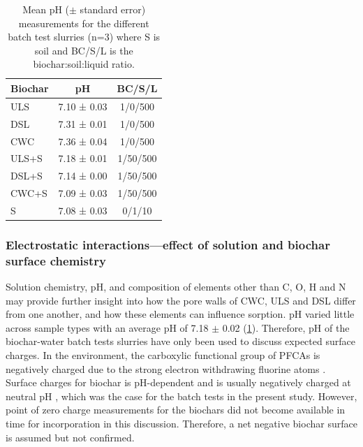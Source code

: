 \begin{table}
\centering
\caption{Mean pH ($\pm$ standard error) measurements for the different batch test slurries (n=3) where S is soil and BC/S/L is the biochar:soil:liquid ratio.}
\label{tab:pHcond}
\begin{tabular}{lcc}
\toprule
Biochar & \multicolumn{1}{c}{pH} & BC/S/L\\ \midrule
ULS   & 7.10 ± 0.03 & 1/0/500\\
DSL   & 7.31 ± 0.01 & 1/0/500\\
CWC   & 7.36 ± 0.04 & 1/0/500\\
ULS+S & 7.18 ± 0.01 & 1/50/500\\
DSL+S & 7.14 ± 0.00 & 1/50/500\\
CWC+S & 7.09 ± 0.03 & 1/50/500\\
S     & 7.08 ± 0.03 & 0/1/10\\
\bottomrule
\end{tabular}
\end{table}


\subsubsection{Electrostatic interactions---effect of solution and biochar surface chemistry \label{sec:inorganic}} 
Solution chemistry, pH, and composition of elements other than C, O, H and N may provide further insight into how the pore walls of CWC, ULS and DSL differ from one another, and how these elements can influence sorption. pH varied little across sample types with an average pH of 7.18 $\pm$ 0.02 (\cref{tab:pHcond}). Therefore, pH of the biochar-water batch tests slurries have only been used to discuss expected surface charges. In the environment, the carboxylic functional group of PFCAs is negatively charged due to the strong electron withdrawing fluorine atoms \citep{goss2008pKa}. Surface charges for biochar is pH-dependent and is usually negatively charged at neutral pH \citep{zhang2013sorption}, which was the case for the batch tests in the present study. However, point of zero charge measurements for the biochars did not become available in time for incorporation in this discussion. Therefore, a net negative biochar surface is assumed but not confirmed.

